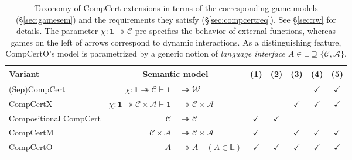 \documentclass[acmsmall,screen,review,anonymous]{acmart}
\begin{document}
\begin{table} %
  \small
  \begin{tabular}{l@{\qquad}r@{}l@{\qquad}c@{\:}c@{\:}c@{\:}c@{\:}c}
    \hline
    Variant & \multicolumn{2}{c}{Semantic model} & (1) & (2) & (3) & (4) & (5) \\
    \hline
    (Sep)CompCert \cite{compcert,sepcompcert} &
      $\chi : \mathbf{1} \twoheadrightarrow \mathcal{C}
      \vdash \mathbf{1} $ & ${} \twoheadrightarrow \mathcal{W}$ &
      & & & $\checkmark$ & $\checkmark$ \\
    CompCertX \cite{popl15} &
      $\chi : \mathbf{1} \twoheadrightarrow \mathcal{C} \times \mathcal{A}
       \vdash
       \mathbf{1} $ & ${} \twoheadrightarrow \mathcal{C} \times \mathcal{A}$
      & & & $\checkmark$ & $\checkmark$ & $\checkmark$ \\
    Compositional CompCert \cite{compcompcert} &
      $\mathcal{C}$ & ${} \twoheadrightarrow \mathcal{C}$ &
      $\checkmark$ & $\checkmark$ & & & \\
    CompCertM \cite{compcertm} &
      $\mathcal{C} \times \mathcal{A} $ & ${}\twoheadrightarrow
       \mathcal{C} \times \mathcal{A}$ &
      $\checkmark$ & & $\checkmark$ & $\checkmark$ & $\checkmark$ \\
    CompCertO &
      $A $ & ${}\twoheadrightarrow A \quad
      (A \in \mathbb{L})$ &
      $\checkmark$&$\checkmark$&$\checkmark$&$\checkmark$&$\checkmark$ \\
    \hline
  \end{tabular}
  \caption{Taxonomy of CompCert extensions
    in terms of the corresponding game models (\S\ref{sec:gamesem})
    and the requirements they satisfy (\S\ref{sec:compcertreq}).
    See \S\ref{sec:rw} for details.
    The parameter $\chi : \mathbf{1} \twoheadrightarrow \mathcal{C}$
    pre-specifies the behavior of external functions,
    whereas games on the left of arrows
    correspond to dynamic interactions.
    As a distinguishing feature,
    CompCertO's model is parametrized by a generic notion of
    \emph{language interface}
    $A \in \mathbb{L} \supseteq \{\mathcal{C}, \mathcal{A}\}$.
  }
  \label{tbl:compcerts}
\end{table}
\end{document}
